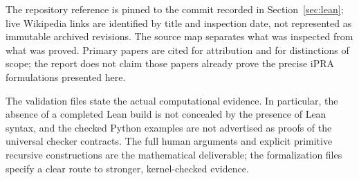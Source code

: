 The repository reference is pinned to the commit recorded in
Section~\ref{sec:lean}; live Wikipedia links are identified by title and
inspection date, not represented as immutable archived revisions. The source
map separates what was inspected from what was proved. Primary papers are
cited for attribution and for distinctions of scope; the report does not
claim those papers already prove the precise iPRA formulations presented
here.

The validation files state the actual computational evidence. In particular,
the absence of a completed Lean build is not concealed by the presence of
Lean syntax, and the checked Python examples are not advertised as proofs
of the universal checker contracts. The full human arguments and explicit
primitive recursive constructions are the mathematical deliverable; the
formalization files specify a clear route to stronger, kernel-checked
evidence.
